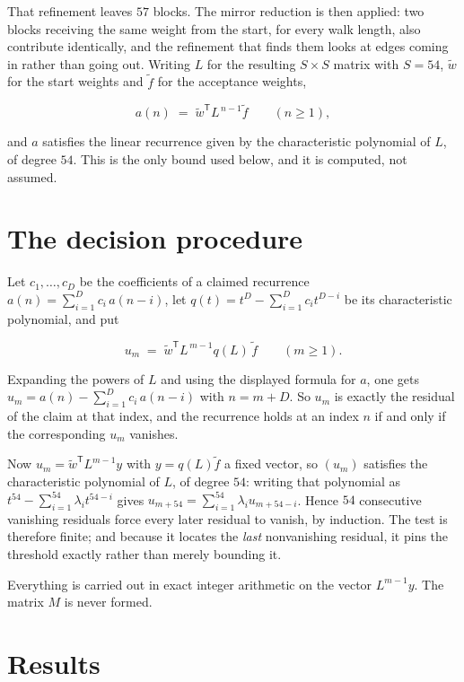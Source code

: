 \documentclass[11pt]{article}
\theoremstyle{definition}
\begin{document}
That refinement leaves $57$ blocks. The mirror reduction is then applied: two blocks receiving the same weight from the start, for every walk length, also contribute identically, and the refinement that finds them looks at edges coming in rather than going out. Writing $L$ for the resulting $S \times S$ matrix with $S = 54$, $\tilde w$ for the start weights and $\tilde f$ for the acceptance weights,

\[a(n) \;=\; \tilde w^{\mathsf T} L^{\,n-1} \tilde f \qquad (n \ge 1),\]

and $a$ satisfies the linear recurrence given by the characteristic polynomial of $L$, of degree $54$. This is the only bound used below, and it is computed, not assumed.

\section{The decision procedure}

Let $c_1,\dots,c_D$ be the coefficients of a claimed recurrence $a(n) = \sum_{i=1}^{D} c_i\,a(n-i)$, let $q(t) = t^{D} - \sum_{i=1}^{D} c_i t^{D-i}$ be its characteristic polynomial, and put

\[u_m \;=\; \tilde w^{\mathsf T} L^{\,m-1} q(L)\,\tilde f \qquad (m \ge 1).\]

Expanding the powers of $L$ and using the displayed formula for $a$, one gets $u_m = a(n) - \sum_{i=1}^{D} c_i\,a(n-i)$ with $n = m + D$. So $u_m$ is exactly the residual of the claim at that index, and the recurrence holds at an index $n$ if and only if the corresponding $u_m$ vanishes.

Now $u_m = \tilde w^{\mathsf T} L^{m-1} y$ with $y = q(L)\tilde f$ a fixed vector, so $(u_m)$ satisfies the characteristic polynomial of $L$, of degree $54$: writing that polynomial as $t^{54} - \sum_{i=1}^{54} \lambda_i t^{54-i}$ gives $u_{m+54} = \sum_{i=1}^{54} \lambda_i u_{m+54-i}$. Hence $54$ consecutive vanishing residuals force every later residual to vanish, by induction. The test is therefore finite; and because it locates the {\itshape last} nonvanishing residual, it pins the threshold exactly rather than merely bounding it.

Everything is carried out in exact integer arithmetic on the vector $L^{m-1}y$. The matrix $M$ is never formed.

\section{Results}
\end{document}
